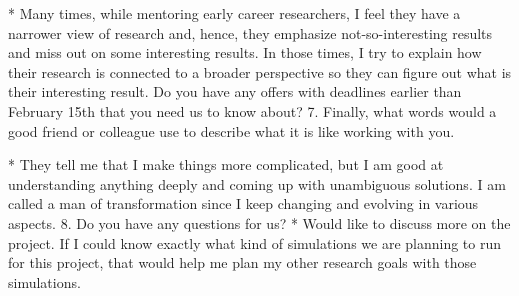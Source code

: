 *
Many times, while mentoring early career researchers, I feel they have a narrower view of research and, hence, they emphasize not-so-interesting results and miss out on some interesting results. In those times, I try to explain how their research is connected to a broader perspective so they can figure out what is their interesting result.
Do you have any offers with deadlines earlier than February 15th that you need us to know about?
7. Finally, what words would a good friend or colleague use to describe what it is like working with you.

*
They tell me that I make things more complicated, but I am good at understanding anything deeply and coming up with unambiguous solutions. 
I am called a man of transformation since I keep changing and evolving in various aspects.
8. Do you have any questions for us?
*
Would like to discuss more on the project.
If I could know exactly what kind of simulations we are planning to run for this project, that would help me plan my other research goals with those simulations.
